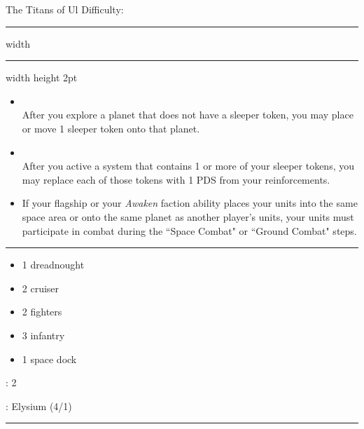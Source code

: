 {\handel\Huge The Titans of Ul} \hfill {\Large Difficulty: \medium} \vspace{-4pt}\\
\hrule width \hsize \kern 1mm \hrule width \hsize height 2pt


\begin{multicols}{2}


\begin{itemize}
\item {}\\
After you explore a planet that does not have a sleeper token, you may place or move 1 sleeper token onto that planet.
\item {}\\
After you active a system that contains 1 or more of your sleeper tokens, you may replace each of those tokens with 1 PDS from your reinforcements.
\item {} If your flagship or your \emph{Awaken} faction ability places your units into the same space area or onto the same planet as another player’s units, your units must participate in combat during the ``Space Combat" or ``Ground Combat" steps. 
\end{itemize}


\vspace{-10pt}\rule{\hsize}{0.4pt}\vspace{5pt}


\vspace{-5pt}
\begin{multicols}{2}
\begin{itemize}
\item 1 dreadnought
\item 2 cruiser
\item 2 fighters
\item 3 infantry
\item 1 space dock
\end{itemize}
\end{multicols}

\vspace{-5pt}
: 2

\vspace{2pt}
: Elysium (4/1)

\rule{\hsize}{0.4pt}\vspace{5pt}



\end{multicols}
